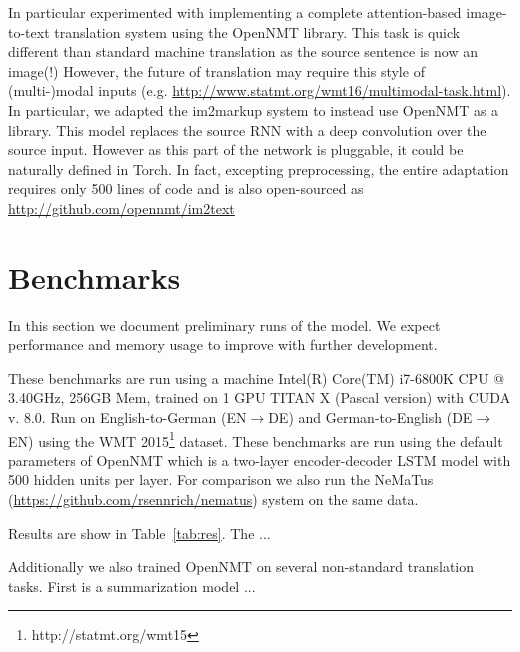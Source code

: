 \documentclass[11pt]{article}
\begin{document}
In particular experimented with implementing a complete
attention-based image-to-text translation system
\cite{DBLP:journals/corr/XuBKCCSZB15} using the OpenNMT library. This
task is quick different than standard machine translation as the
source sentence is now an image(!)  However, the future of translation
may require this style of (multi-)modal inputs
(e.g. \url{http://www.statmt.org/wmt16/multimodal-task.html}). In
particular, we adapted the im2markup system
\cite{DBLP:journals/corr/DengKR16} to instead use OpenNMT as a
library.  This model replaces the source RNN with a deep convolution
over the source input. However as this part of the network is
pluggable, it could be naturally defined in Torch. In fact, excepting
preprocessing, the entire adaptation requires only 500 lines of code
and is also open-sourced as \url{http://github.com/opennmt/im2text}

\section{Benchmarks}


In this section we document preliminary runs of the model. We expect
performance and memory usage to improve with further development.

These benchmarks are run using a machine Intel(R) Core(TM) i7-6800K CPU @
3.40GHz, 256GB Mem, trained on 1 GPU TITAN X (Pascal version) with
CUDA v. 8.0.  Run on English-to-German (EN$\rightarrow$DE) and
German-to-English (DE$\rightarrow$EN) using the WMT 2015\footnote{http://statmt.org/wmt15}
dataset. These benchmarks are run using the default parameters of
OpenNMT which is a two-layer encoder-decoder LSTM model with 500
hidden units per layer. For comparison we also run the NeMaTus (\url{https://github.com/rsennrich/nematus}) system on 
the same data.


Results are show in Table~\ref{tab:res}. The ...


Additionally we also trained OpenNMT on several non-standard
translation tasks. First is a summarization model \cite{} ...
\end{document}
